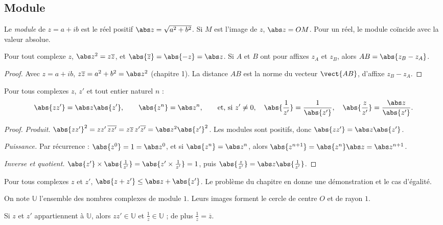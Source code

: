 \subsection{Module}
\begin{definition}[Module]
Le \emph{module} de $z=a+ib$ est le réel positif $\abs z=\sqrt{a^2+b^2}$. Si $M$ est l'image de $z$, $\abs z=OM$. Pour un réel, le module coïncide avec la valeur absolue.
\end{definition}
\begin{theorem}
Pour tout complexe $z$, $\abs z^2=z\overline z$, et $\abs{\overline z}=\abs{-z}=\abs z$. Si $A$ et $B$ ont pour affixes $z_A$ et $z_B$, alors $AB=\abs{z_B-z_A}$.
\end{theorem}
\begin{proof}
Avec $z=a+ib$, $z\overline z=a^2+b^2=\abs z^2$ (chapitre 1). La distance $AB$ est la norme du vecteur $\vect{AB}$, d'affixe $z_B-z_A$.
\end{proof}
\begin{theorem}
Pour tous complexes $z$, $z'$ et tout entier naturel $n$ :
\[\abs{zz'}=\abs z\abs{z'},\qquad\abs{z^n}=\abs z^n,\qquad\text{et, si }z'\neq0,\quad\abs{\frac1{z'}}=\frac1{\abs{z'}},\quad\abs{\frac z{z'}}=\frac{\abs z}{\abs{z'}}.\]
\end{theorem}
\begin{proof}
\emph{Produit.} $\abs{zz'}^2=zz'\,\overline{zz'}=z\overline z\,z'\overline{z'}=\abs z^2\abs{z'}^2$. Les modules sont positifs, donc $\abs{zz'}=\abs z\abs{z'}$.\par
\emph{Puissance.} Par récurrence : $\abs{z^0}=1=\abs z^0$, et si $\abs{z^n}=\abs z^n$, alors $\abs{z^{n+1}}=\abs{z^n}\abs z=\abs z^{n+1}$.\par
\emph{Inverse et quotient.} $\abs{z'}\times\abs{\frac1{z'}}=\abs{z'\times\frac1{z'}}=1$, puis $\abs{\frac z{z'}}=\abs z\abs{\frac1{z'}}$.
\end{proof}
\begin{theorem}
Pour tous complexes $z$ et $z'$, $\abs{z+z'}\le\abs z+\abs{z'}$. Le problème du chapitre en donne une démonstration et le cas d'égalité.
\end{theorem}
\begin{definition}
On note $\mathbb U$ l'ensemble des nombres complexes de module $1$. Leurs images forment le cercle de centre $O$ et de rayon $1$.
\end{definition}
\begin{theorem}
Si $z$ et $z'$ appartiennent à $\mathbb U$, alors $zz'\in\mathbb U$ et $\frac1z\in\mathbb U$ ; de plus $\frac1z=\overline z$.
\end{theorem}

